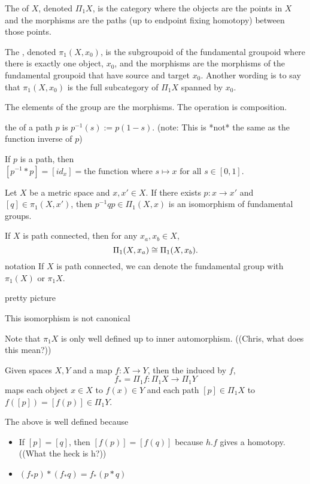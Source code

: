 \documentclass[11pt,leqno,oneside]{amsart}
\numberwithin{thm}{section}
\begin{document}
\begin{defn}
  The  of $X$, denoted $\Pi_1 X$, is the
  category where the objects are the points in $X$ and the morphisms
  are the paths (up to endpoint fixing homotopy) between those points.
\end{defn}
\begin{defn}
  The , denoted
  $\pi_1(X, x_0)$, is the subgroupoid of the fundamental groupoid
  where there is exactly one object, $x_0$, and the morphisms are the
  morphisms of the fundamental groupoid that have source and target
  $x_0$.  Another wording is to say that $\pi_1(X, x_0)$ is the full
  subcategory of $\Pi_1 X$ spanned by $x_0$.

  The elements of the group are the morphisms.  The operation is
  composition.
\end{defn}
\begin{defn}
  the  of a path $p$ is $p^{-1}(s) := p(1-s)$.
  (note: This is *not* the same as the function inverse of $p$)
\end{defn}
\begin{prop}
  If $p$ is a path, then
  $[p^{-1}*p] = [id_{x}] = \text{the function where $s \mapsto x$ for
    all $s \in [0,1]$}$.
\end{prop}

\begin{thm}[Hatcher 1.5]
  Let $X$ be a metric space and $x,x' \in X$.  If there exists
  $p: x \to x'$ and $[q] \in \pi_1(X,x')$, then
  $p^{-1}qp \in \Pi_1(X,x)$ is an isomorphism of fundamental groups.
\end{thm}
\begin{thm}
  If $X$ is path connected, then for any $x_a, x_b \in X$,
  $$\Pi_1(X, x_a) \mathrel{\cong} \Pi_1(X, x_b).$$
  notation If $X$ is path connected, we can denote the fundamental
  group with $\pi_1(X)$ or $\pi_1 X$.
\end{thm}
\begin{example}
  pretty picture

  This isomorphism is not canonical


  Note that $\pi_1 X$ is only well defined up to inner automorphism.
  ((Chris, what does this mean?))
\end{example}
\begin{defn}
  Given spaces $X, Y$ and a map $f: X \to Y$, then the
   induced by $f$,
  $$f_* = \Pi_1 f : \Pi_1 X \to \Pi_1 Y$$ maps each object $x \in X$
  to $f(x) \in Y$ and each path $[p] \in \Pi_1 X$ to
  $f([p]) = [f(p)] \in \Pi_1 Y$.
\end{defn}
\begin{prop}
  The above is well defined because
  \begin{itemize}
  \item If $[p]=[q]$, then $[f(p)] = [f(q)]$ because $h.f$ gives a
    homotopy.  ((What the heck is h?))
  \item $(f_*p)*(f_*q) = f_*(p*q)$
  \end{itemize}
\end{prop}
\end{document}
